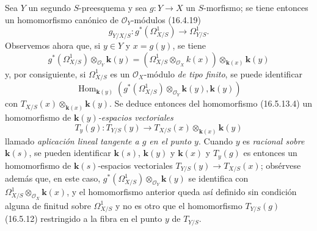 \begin{env}[16.5.13]
Sea $Y$ un segundo $S$-preesquema y sea $g:Y\to X$ un $S$-morfismo; se tiene
entonces un homomorfismo canónico de $\mathcal{O}_Y$-módulos (16.4.19)
\[
  g_{Y/X/S}:g^*(\varOmega_{X/S}^1)\longrightarrow\varOmega_{Y/S}^1.
  \tag{16.5.13.4}
  \label{IV.16.5.13.4}
\]
Observemos ahora que, si $y\in Y$ y $x=g(y)$, se tiene
\[
  g^*(\varOmega_{X/S}^1)\otimes_{\mathcal{O}_Y}\boldsymbol k(y)
  =(\varOmega_{X/S}^1\otimes_{\mathcal{O}_X}k(x))
  \otimes_{\mathbf k(x)}\boldsymbol k(y)
\]
y, por consiguiente, si $\varOmega_{X/S}^1$ es un $\mathcal{O}_X$-módulo
\emph{de tipo finito}, se puede identificar
\[
  \operatorname{Hom}_{\mathbf k(y)}
  (g^*(\varOmega_{X/S}^1)\otimes_{\mathcal{O}_Y}\boldsymbol k(y),\boldsymbol k(y))
\]
con $T_{X/S}(x)\otimes_{\mathbf k(x)}\boldsymbol k(y)$. Se deduce entonces del homomorfismo
(16.5.13.4) un homomorfismo de \emph{$\boldsymbol k(y)$-espacios vectoriales}
\[
  T_y(g):T_{Y/S}(y)\longrightarrow
  T_{X/S}(x)\otimes_{\mathbf k(x)}\boldsymbol k(y)
  \tag{16.5.13.5}
  \label{IV.16.5.13.5}
\]
llamado \emph{aplicación lineal tangente a $g$ en el punto $y$}. Cuando $y$ es
\emph{racional sobre $\boldsymbol k(s)$}, se pueden identificar $\boldsymbol k(s)$, $\boldsymbol k(y)$ y $\boldsymbol k(x)$ y
$T_y(g)$ es entonces un homomorfismo de $\boldsymbol k(s)$-espacios vectoriales
$T_{Y/S}(y)\to T_{X/S}(x)$; obsérvese además que, en este caso,
$g^*(\varOmega_{X/S}^1)\otimes_{\mathcal{O}_Y}\boldsymbol k(y)$ se identifica con
$\varOmega_{X/S}^1\otimes_{\mathcal{O}_X}\boldsymbol k(x)$, y el homomorfismo anterior queda
así definido sin condición alguna de finitud sobre $\varOmega_{X/S}^1$ y no es
otro que el homomorfismo $T_{Y/S}(g)$ (16.5.12) restringido a la fibra en el punto
$y$ de $T_{Y/S}$.
\end{env}

